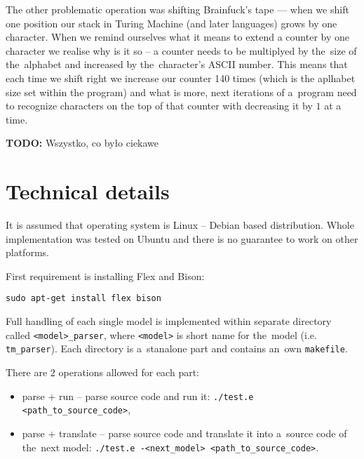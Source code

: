 \documentclass[english,shortabstract,mgr]{iithesis}
\newcommand{\todo}[1]{\textbf{TODO:} #1}
\begin{document}
The other problematic operation was shifting Brainfuck's tape --- when we shift
one position our stack in Turing Machine (and later languages) grows by one
character. When we remind ourselves what it means to extend a counter by
one character we realise why is it so -- a counter needs to be multiplyed by
the~size of the~alphabet and increased by the~character's ASCII number.
This means that each time we shift right we increase our counter 140 times
(which is the aplhabet size set within the program) and what is more, next
iterations of a~program need to recognize characters on the top of that
counter with decreasing it by $1$ at a time.

\todo{Wszystko, co było ciekawe}

\section{Technical details}

It is assumed that operating system is Linux -- Debian based distribution. Whole implementation
was tested on Ubuntu and there is no guarantee to work on other platforms.

First requirement is installing Flex and Bison:

\texttt{sudo apt-get install flex bison}

Full handling of each single model is implemented within separate directory called
\texttt{<model>\_parser}, where \texttt{<model>} is short name for the~model
(i.e. \texttt{tm\_parser}). Each directory is a~stanalone part and contains
an~own \texttt{makefile}.

There are $2$ operations allowed for each part:
\begin{itemize}
  \item parse + run -- parse source code and run it: \texttt{./test.e <path\_to\_source\_code>},
  \item parse + translate -- parse source code and translate it into a~source code
      of the~next model: \texttt{./test.e -<next\_model> <path\_to\_source\_code>}.
\end{itemize}
\end{document}

